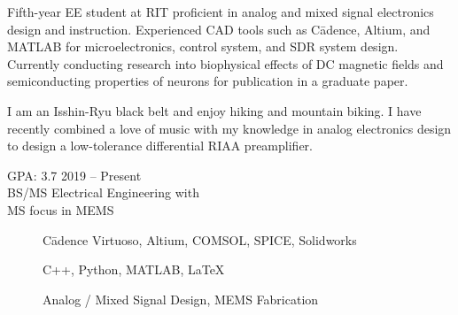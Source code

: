 \documentclass{cv}  %
\begin{document}
\begin{paracol}{2}


\RaggedRight
Fifth-year EE student at RIT proficient in analog and mixed signal electronics design and instruction. Experienced CAD tools such as C\=adence, Altium, and MATLAB for microelectronics, control system, and SDR system design. Currently conducting research into biophysical effects of DC magnetic fields and semiconducting properties of neurons for publication in a graduate paper.

I am an Isshin-Ryu black belt and enjoy hiking and mountain biking. I have recently combined a love of music with my knowledge in analog electronics design to design a low-tolerance differential RIAA preamplifier.

{\large{}}

{GPA: 3.7} \hfill 2019 -- Present \\
BS/MS Electrical Engineering with \\
MS focus in MEMS\\



\begin{description}
    \item[\faLaptop] \hspace{0.25em} C\=adence Virtuoso, Altium, COMSOL, SPICE, Solidworks
\end{description}
\begin{description}
    \item[\faCode] \hspace{0.25em} C++, Python, MATLAB, \LaTeX{}
\end{description}
\begin{description}
    \item[\faWrench] \hspace{0.25em} Analog / Mixed Signal Design, MEMS Fabrication \par
\end{description}


\end{paracol}
\end{document}
